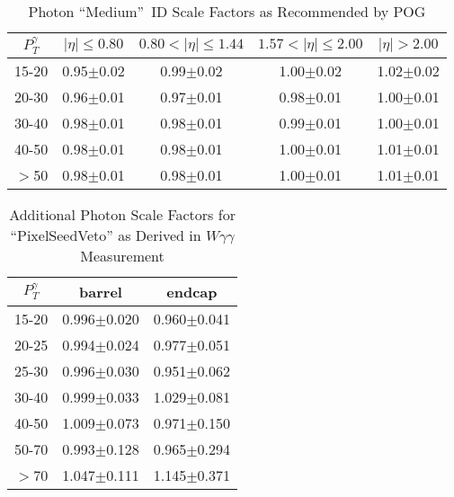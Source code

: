 \begin{table}[h]
  \footnotesize
  \begin{center}
  \caption{Photon ``Medium''~ID Scale Factors as Recommended by POG} 
   \begin{tabular}{|c|c|c|c|c|}
 $P_T^{\gamma}$  & $|\eta|\leq 0.80$ & $0.80<|\eta|\leq 1.44$ & $1.57<|\eta|\leq 2.00$ & $|\eta|> 2.00$\\ \hline
15-20          & 0.95$\pm$0.02   & 0.99$\pm$0.02        & 1.00$\pm$0.02        & 1.02$\pm$0.02 \\ \hline
20-30          & 0.96$\pm$0.01   & 0.97$\pm$0.01        & 0.98$\pm$0.01        & 1.00$\pm$0.01 \\ \hline
30-40          & 0.98$\pm$0.01   & 0.98$\pm$0.01        & 0.99$\pm$0.01        & 1.00$\pm$0.01 \\ \hline
40-50          & 0.98$\pm$0.01   & 0.98$\pm$0.01        & 1.00$\pm$0.01        & 1.01$\pm$0.01 \\ \hline
$>$50          & 0.98$\pm$0.01   & 0.98$\pm$0.01        & 1.00$\pm$0.01        & 1.01$\pm$0.01 \\ \hline
  \end{tabular}
  \label{tab:SFs_PhotonID}
  \end{center}
\end{table}

\begin{table}[h]
  \footnotesize
  \begin{center}
  \caption{Additional Photon Scale Factors for ``PixelSeedVeto'' as Derived in $W\gamma\gamma$ Measurement} 
   \begin{tabular}{|c|c|c|}
 $P_T^{\gamma}$  & barrel              & endcap \\ \hline
15-20          & 0.996$\pm$0.020     & 0.960$\pm$0.041 \\ \hline
20-25          & 0.994$\pm$0.024     & 0.977$\pm$0.051 \\ \hline
25-30          & 0.996$\pm$0.030     & 0.951$\pm$0.062 \\ \hline
30-40          & 0.999$\pm$0.033     & 1.029$\pm$0.081 \\ \hline
40-50          & 1.009$\pm$0.073     & 0.971$\pm$0.150 \\ \hline
50-70          & 0.993$\pm$0.128     & 0.965$\pm$0.294 \\ \hline
$>$70          & 1.047$\pm$0.111     & 1.145$\pm$0.371 \\ \hline

  \end{tabular}
  \label{tab:SFs_PhotonPixelSeedVeto}
  \end{center}
\end{table}
